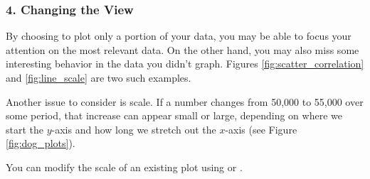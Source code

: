 \subsubsection*{4. Changing the View}

By choosing to plot only a portion of your data, you may be able to focus your attention on the most relevant data.  On the other hand, you may also miss some interesting behavior in the data you didn't graph. Figures \ref{fig:scatter_correlation} and \ref{fig:line_scale} are two such examples. 

Another issue to consider is scale. If a number changes from 50,000 to 55,000 over some period, that  increase can appear small or large, depending on where we start the $y$-axis and how long we stretch out the $x$-axis (see Figure \ref{fig:dog_plots}).

You can modify the scale of an existing plot using  or .

